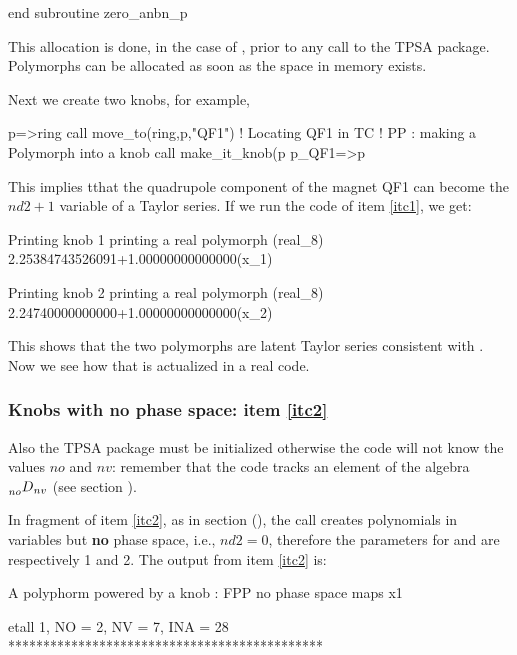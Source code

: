 \documentclass{hitec}     %
\begin{document}
{{{{{\begin{code}
  end subroutine zero_anbn_p
\end{code}

This allocation is done, in the case of , prior to any call to the TPSA package. Polymorphs can be allocated as soon as the space in memory exists.

Next we create two knobs, for example,

\begin{code}
p=>ring%
call move_to(ring,p,"QF1")   !  Locating QF1 in TC
!  PP : making a Polymorph into a knob
call make_it_knob(p%
p_QF1=>p
\end{code}

This implies tthat the quadrupole component  of the magnet QF1 can become the $nd2+1$ variable of a Taylor series. If we run the code of item \ref{itc1}, we get:

\begin{code}
 Printing knob 1
  printing a real polymorph (real_8)
2.25384743526091+1.00000000000000(x_1)

 Printing knob 2
  printing a real polymorph (real_8)
2.24740000000000+1.00000000000000(x_2)
\end{code}

This shows that the two polymorphs are latent Taylor series consistent with . Now we see how that is actualized in a real code.

\subsubsection{Knobs with no phase space: item \ref{itc2}}
\label{s:initigno}


 Also the TPSA package must be initialized otherwise the code will not know the values $no$ and  $nv$: remember that the code tracks an element of the algebra $\prescript{}{no}{D}_{nv}$ (see section ).

In fragment of item \ref{itc2},  as in section (), the call  creates polynomials in  variables but {\bf no} phase space, i.e., $nd2=0$, therefore the parameters for  and  are respectively 1 and 2.  The output from item \ref{itc2} is:

\renewcommand{\codefont}{\footnotesize}
\begin{code}
 A polyphorm powered by a knob : FPP no phase space maps
  x1

 etall    1, NO =    2, NV =    7, INA =   28
 *********************************************


\end{code}}}}}}
\end{document}
